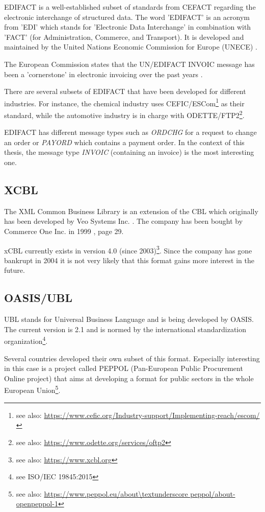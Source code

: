 EDIFACT is a well-established \cite{basware} subset of standards from CEFACT regarding the electronic interchange of structured data. The word 'EDIFACT' is an acronym from 'EDI' which stands for 'Electronic Data Interchange' in combination with 'FACT' (for Administration, Commerce, and Transport). It is developed and maintained by the United Nations Economic Commission for Europe (UNECE) \cite{unece}.

The European Commission states that the UN/EDIFACT INVOIC message has been a 'cornerstone' in electronic invoicing over the past years \cite[page 14]{ec12}.

There are several subsets of EDIFACT that have been developed for different industries. For instance, the chemical industry uses CEFIC/ESCom\footnote{see also: \url{https://www.cefic.org/Industry-support/Implementing-reach/escom/}} as their standard, while the automotive industry is in charge with ODETTE/FTP2\footnote{see also: \url{https://www.odette.org/services/oftp2}}.

EDIFACT has different message types such as \emph{ORDCHG} for a request to change an order or \emph{PAYORD} which contains a payment order. In the context of this thesis, the message type \emph{INVOIC} (containing an invoice) is the most interesting one.

\subsection{XCBL}
\label{sec2.1.2}

The XML Common Business Library is an extension of the CBL which originally has been developed by Veo Systems Inc. \cite{coverpages}. The company has been bought by Commerce One Inc. in 1999 \cite{co}, page 29. 

xCBL currently exists in version 4.0 (since 2003)\footnote{see also: \url{https://www.xcbl.org}}. Since the company has gone bankrupt in 2004 \cite{scm} it is not very likely that this format gains more interest in the future.

\subsection{OASIS/UBL}
\label{sec2.1.3}

UBL stands for Universal Business Language and is being developed by OASIS. The current version is 2.1 and is normed by the international standardization organization\footnote{see ISO/IEC 19845:2015}.

Several countries developed their own subset of this format. Especially interesting in this case is a project called PEPPOL (Pan-European Public Procurement Online project) that aims at developing a format for public sectors in the whole European Union\footnote {see also: \url{https://www.peppol.eu/about\textunderscore peppol/about-openpeppol-1}}. 

